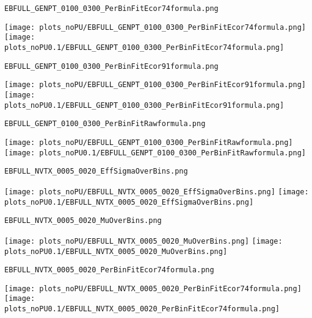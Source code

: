\begin{frame}[fragile]
\begin{verbatim}
EBFULL_GENPT_0100_0300_PerBinFitEcor74formula.png
\end{verbatim}
\texttt{[image: plots\_noPU/EBFULL\_GENPT\_0100\_0300\_PerBinFitEcor74formula.png]}
\texttt{[image: plots\_noPU0.1/EBFULL\_GENPT\_0100\_0300\_PerBinFitEcor74formula.png]}
\end{frame}
\begin{frame}[fragile]
\begin{verbatim}
EBFULL_GENPT_0100_0300_PerBinFitEcor91formula.png
\end{verbatim}
\texttt{[image: plots\_noPU/EBFULL\_GENPT\_0100\_0300\_PerBinFitEcor91formula.png]}
\texttt{[image: plots\_noPU0.1/EBFULL\_GENPT\_0100\_0300\_PerBinFitEcor91formula.png]}
\end{frame}
\begin{frame}[fragile]
\begin{verbatim}
EBFULL_GENPT_0100_0300_PerBinFitRawformula.png
\end{verbatim}
\texttt{[image: plots\_noPU/EBFULL\_GENPT\_0100\_0300\_PerBinFitRawformula.png]}
\texttt{[image: plots\_noPU0.1/EBFULL\_GENPT\_0100\_0300\_PerBinFitRawformula.png]}
\end{frame}
\begin{frame}[fragile]
\begin{verbatim}
EBFULL_NVTX_0005_0020_EffSigmaOverBins.png
\end{verbatim}
\texttt{[image: plots\_noPU/EBFULL\_NVTX\_0005\_0020\_EffSigmaOverBins.png]}
\texttt{[image: plots\_noPU0.1/EBFULL\_NVTX\_0005\_0020\_EffSigmaOverBins.png]}
\end{frame}
\begin{frame}[fragile]
\begin{verbatim}
EBFULL_NVTX_0005_0020_MuOverBins.png
\end{verbatim}
\texttt{[image: plots\_noPU/EBFULL\_NVTX\_0005\_0020\_MuOverBins.png]}
\texttt{[image: plots\_noPU0.1/EBFULL\_NVTX\_0005\_0020\_MuOverBins.png]}
\end{frame}
\begin{frame}[fragile]
\begin{verbatim}
EBFULL_NVTX_0005_0020_PerBinFitEcor74formula.png
\end{verbatim}
\texttt{[image: plots\_noPU/EBFULL\_NVTX\_0005\_0020\_PerBinFitEcor74formula.png]}
\texttt{[image: plots\_noPU0.1/EBFULL\_NVTX\_0005\_0020\_PerBinFitEcor74formula.png]}
\end{frame}
